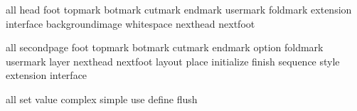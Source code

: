 

\unprotect


\startinterface all
              {head}
              {foot}
           {topmark}
           {botmark}
           {cutmark}
           {endmark}
          {usermark}
          {foldmark}
         {extension}
         {interface}
   {backgroundimage}
        {whitespace}
          {nexthead}
          {nextfoot}
\stopinterface

\startinterface all
    {secondpage}
          {foot}
       {topmark}
       {botmark}
       {cutmark}
       {endmark}
        {option}
      {foldmark}
      {usermark}
         {layer}
      {nexthead}
      {nextfoot}
        {layout}
         {place}
    {initialize}
        {finish}
      {sequence}
         {style}
     {extension}
     {interface}
\stopinterface

\startinterface all
         {set}
       {value}
     {complex}
      {simple}
         {use}
      {define}
       {flush}
\stopinterface


